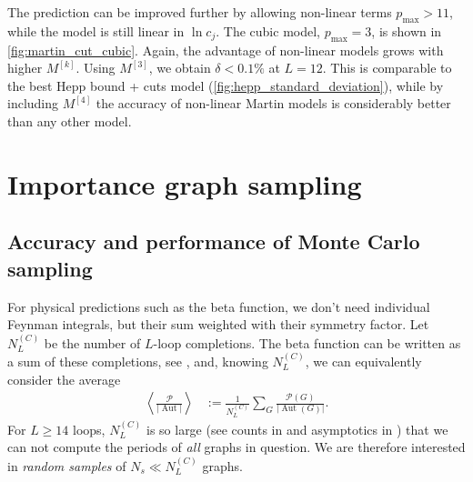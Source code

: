 \documentclass[12pt]{article}
\numberwithin{equation}{section}
\newcommand{\abs}[1]{\lvert #1 \rvert}
\newcommand{\period}{\mathcal P}
\newcommand{\Aut}{\operatorname{Aut}}
\begin{document}
The prediction can be improved further by allowing non-linear terms  $p_\text{max}>11$, while the model is still linear in $\ln c_j $. The cubic model, $p_\text{max}=3$, is shown in \cref{fig:martin_cut_cubic}. Again, the advantage of non-linear models grows with higher $M^{[k]}$. Using $M^{[3]}$,   we obtain $\delta<0.1\%$ at $L=12$. This is comparable to the best Hepp bound + cuts model (\cref{fig:hepp_standard_deviation}), while by including $M^{[4]}$ the accuracy of non-linear Martin models is considerably better than any other model. 


























\FloatBarrier

\newpage


\section{Importance graph sampling}\label{sec:sampling}


\subsection{Accuracy and performance of Monte Carlo sampling}\label{sec:accuracy_performance}
For physical predictions such as the beta function, we don't need individual Feynman integrals, but their sum  weighted with their symmetry factor. 
Let $N_L^{(C)}$ be the number of $L$-loop completions. The beta function can be written as a sum of these completions, see \cite{panzer_hepp_2022}, and, knowing $N_L^{(C)}$, we can equivalently consider the average
\begin{align}\label{PAut_average}
	\left \langle\frac{ \period}{\abs{\Aut}} \right \rangle &:= \frac{1}{N_L^{(C)}} \sum_G\frac{ \period(G)}{\abs{\Aut(G)}}.
\end{align}
For $L \geq 14$ loops, $N_L^{(C)}$ is so large (see counts in \cite{balduf_statistics_2023} and asymptotics in \cite{borinsky_renormalized_2017}) that we can not compute the periods of \emph{all} graphs in question. We are therefore interested in \emph{random samples} of $N_s\ll N_L^{(C)}$ graphs. 
\end{document}

